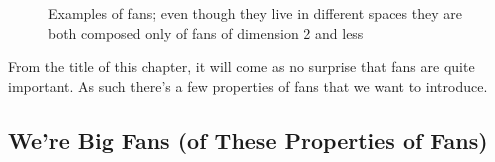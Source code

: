 \documentclass[12pt,oneside]{../../sfsuthesis}
\begin{document}
\begin{figure}[H]
\begin{subfigure}{0.48\textwidth}
    \end{subfigure}
    \caption{Examples of fans; even though they live in different spaces they are both composed only of fans of dimension 2 and less}
    \label{fig:fans}
\end{figure}
From the title of this chapter, it will come as no surprise that fans are quite important.
As such there's a few properties of fans that we want to introduce.

\subsection{We're Big Fans (of These Properties of Fans)}
\end{document}
